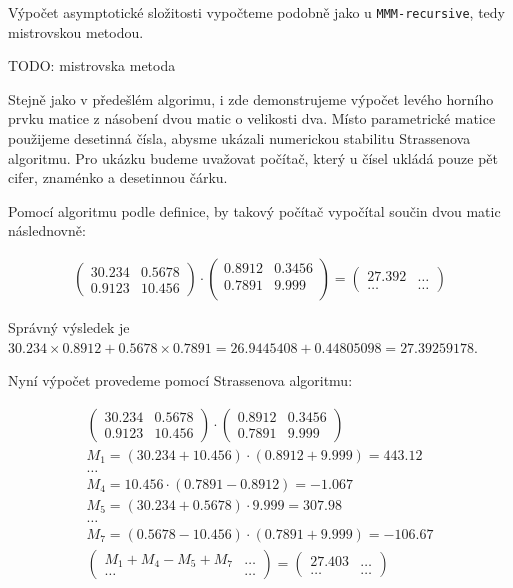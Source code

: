 \documentclass[thesis=B,czech]{FITthesis}[2012/06/26]
\begin{document}
Výpočet asymptotické složitosti vypočteme podobně jako u \texttt{MMM-recursive}, tedy mistrovskou metodou. 

TODO: mistrovska metoda

Stejně jako v předešlém algorimu, i zde demonstrujeme výpočet levého horního prvku matice z násobení dvou matic o velikosti dva. Místo parametrické matice použijeme desetinná čísla, abysme ukázali numerickou stabilitu Strassenova algoritmu. Pro ukázku budeme uvažovat počítač, který u čísel ukládá pouze pět cifer, znaménko a desetinnou čárku.	

Pomocí algoritmu podle definice, by takový počítač vypočítal součin dvou matic následnovně:

\begin{align}
\begin{pmatrix}
 30.234 & 0.5678 \\
 0.9123 & 10.456
\end{pmatrix} \cdot \begin{pmatrix}
 0.8912 & 0.3456 \\
 0.7891 & 9.999 \\
\end{pmatrix} = \begin{pmatrix}
 27.392 & \hdots \\
 \hdots & \hdots
\end{pmatrix}
\end{align}

Správný výsledek je $30.234 \times 0.8912 + 0.5678 \times 0.7891 = 26.9445408 + 0.44805098 = 27.39259178$.

Nyní výpočet provedeme pomocí Strassenova algoritmu:

\begin{align}
\begin{pmatrix}
 30.234 & 0.5678 \\
 0.9123 & 10.456
\end{pmatrix} \cdot \begin{pmatrix}
 0.8912 & 0.3456 \\
 0.7891 & 9.999
\end{pmatrix} \\
M_{1} = (30.234 + 10.456) \cdot (0.8912 + 9.999) = 443.12  \\
\hdots \\
M_{4} = 10.456 \cdot (0.7891 - 0.8912) = -1.067 \\
M_{5} = (30.234 + 0.5678) \cdot 9.999 = 307.98 \\
\hdots \\
M_{7} = (0.5678 - 10.456) \cdot (0.7891 + 9.999) = -106.67 \\
 \begin{pmatrix}
 M_{1} + M_{4} - M_{5} + M_{7} & \hdots \\
 \hdots & \hdots
\end{pmatrix} = \begin{pmatrix}
 27.403 & \hdots \\
 \hdots & \hdots
\end{pmatrix}
\end{align}
\end{document}
